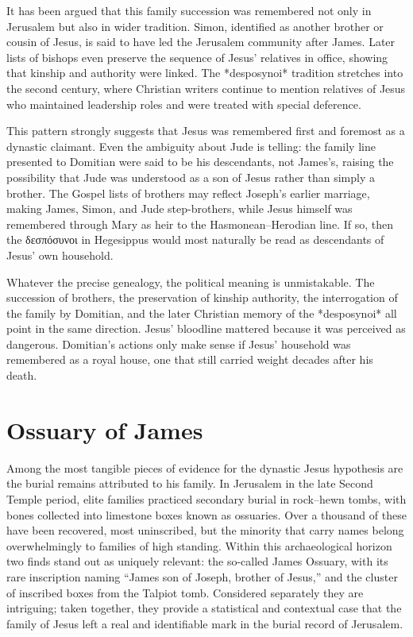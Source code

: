 It has been argued that this family succession was remembered not only in Jerusalem but also in wider tradition.
Simon, identified as another brother or cousin of Jesus, is said to have led the Jerusalem community after James.
Later lists of bishops even preserve the sequence of Jesus’ relatives in office, showing that kinship and authority were linked.
The *desposynoi* tradition stretches into the second century, where Christian writers continue to mention relatives of Jesus who maintained leadership roles and were treated with special deference.

This pattern strongly suggests that Jesus was remembered first and foremost as a dynastic claimant.
Even the ambiguity about Jude is telling: the family line presented to Domitian were said to be his descendants, not James’s, raising the possibility that Jude was understood as a son of Jesus rather than simply a brother.
The Gospel lists of brothers may reflect Joseph’s earlier marriage, making James, Simon, and Jude step-brothers, while Jesus himself was remembered through Mary as heir to the Hasmonean–Herodian line.
If so, then the δεσπόσυνοι in Hegesippus would most naturally be read as descendants of Jesus’ own household.

Whatever the precise genealogy, the political meaning is unmistakable.
The succession of brothers, the preservation of kinship authority, the interrogation of the family by Domitian, and the later Christian memory of the *desposynoi* all point in the same direction.
Jesus’ bloodline mattered because it was perceived as dangerous.
Domitian’s actions only make sense if Jesus’ household was remembered as a royal house, one that still carried weight decades after his death.

\section{Ossuary of James}\label{sec:ossuary-of-james}

Among the most tangible pieces of evidence for the dynastic Jesus hypothesis are the burial remains attributed to his family.
In Jerusalem in the late Second Temple period, elite families practiced secondary burial in rock–hewn tombs, with bones collected into limestone boxes known as ossuaries.
Over a thousand of these have been recovered, most uninscribed, but the minority that carry names belong overwhelmingly to families of high standing.
Within this archaeological horizon two finds stand out as uniquely relevant: the so-called James Ossuary, with its rare inscription naming “James son of Joseph, brother of Jesus,” and the cluster of inscribed boxes from the Talpiot tomb.
Considered separately they are intriguing; taken together, they provide a statistical and contextual case that the family of Jesus left a real and identifiable mark in the burial record of Jerusalem.

